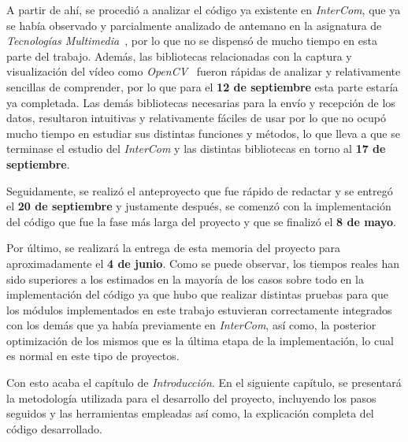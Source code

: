 A partir de ahí, se procedió a analizar el código ya existente en \textit{InterCom}, que ya se había observado y parcialmente analizado de antemano en la asignatura de \textit{Tecnologías Multimedia}~\cite{tec_multi}, por lo que no se dispensó de mucho tiempo en esta parte del trabajo. Además, las bibliotecas relacionadas con la captura y visualización del vídeo como \textit{OpenCV}~\cite{opencv} fueron rápidas de analizar y relativamente sencillas de comprender, por lo que para el \textbf{12 de septiembre} esta parte estaría ya completada. Las demás bibliotecas necesarias para la envío y recepción de los datos, resultaron intuitivas y relativamente fáciles de usar por lo que no ocupó mucho tiempo en estudiar sus distintas funciones y métodos, lo que lleva a que se terminase el estudio del \textit{InterCom} y las distintas bibliotecas en torno al \textbf{17 de septiembre}. 
\vspace{\baselineskip}

Seguidamente, se realizó el anteproyecto que fue rápido de redactar y se entregó el \textbf{20 de septiembre} y justamente después, se comenzó con la implementación del código que fue la fase más larga del proyecto y que se finalizó el \textbf{8 de mayo}. 
\vspace{\baselineskip}

Por último, se realizará la entrega de esta memoria del proyecto para aproximadamente el \textbf{4 de junio}. Como se puede observar, los tiempos reales han sido superiores a los estimados en la mayoría de los casos sobre todo en la implementación del código ya que hubo que realizar distintas pruebas para que los módulos implementados en este trabajo estuvieran correctamente integrados con los demás que ya había previamente en \textit{InterCom}, así como, la posterior optimización de los mismos que es la última etapa de la implementación, lo cual es normal en este tipo de proyectos.

\vspace{\baselineskip}
Con esto acaba el capítulo de \textit{Introducción}. En el siguiente capítulo, se presentará la metodología utilizada para el desarrollo del proyecto, incluyendo los pasos seguidos y las herramientas empleadas así como, la explicación completa del código desarrollado. 